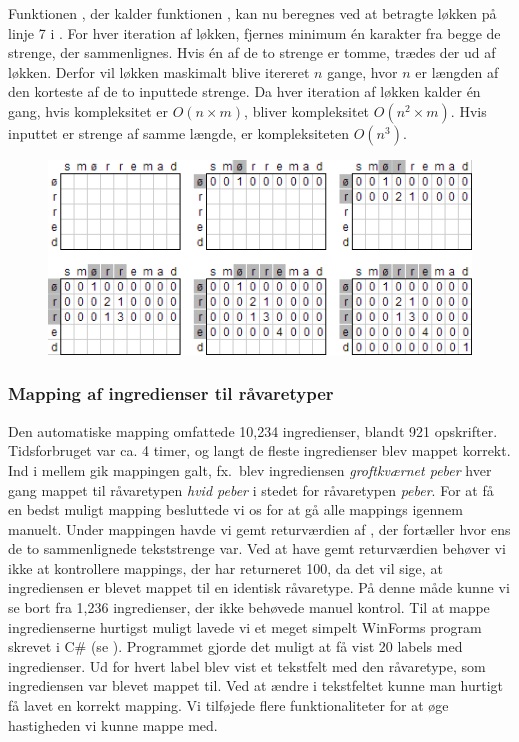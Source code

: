 Funktionen , der kalder funktionen , kan nu beregnes ved at betragte løkken på linje 7 i . For hver iteration af løkken, fjernes minimum én karakter fra begge de strenge, der sammenlignes. Hvis én af de to strenge er tomme, trædes der ud af løkken. Derfor vil løkken maskimalt blive itereret $n$ gange, hvor $n$ er længden af den korteste af de to inputtede strenge.
Da hver iteration af løkken kalder  én gang, hvis kompleksitet er $O(n \times m)$, bliver  kompleksitet $O(n^2 \times m)$. Hvis inputtet er strenge af samme længde, er kompleksiteten $O(n^3)$.
\begin{figure}
\centering
\includegraphics[scale=1]{billeder/longest-common-substring.png}
  \label{fig:longest-common-substring}
\end{figure}

\subsubsection{Mapping af ingredienser til råvaretyper}
Den automatiske mapping omfattede 10,234 ingredienser, blandt 921 opskrifter. Tidsforbruget var ca. 4 timer, og langt de fleste ingredienser blev mappet korrekt. Ind i mellem gik mappingen galt, fx.\ blev ingrediensen \textit{groftkværnet peber} hver gang mappet til råvaretypen \textit{hvid peber} i stedet for råvaretypen \textit{peber}. For at få en bedst muligt mapping besluttede vi os for at gå alle mappings igennem manuelt. Under mappingen havde vi gemt returværdien af , der fortæller hvor ens de to sammenlignede tekststrenge var. Ved at have gemt returværdien behøver vi ikke at kontrollere mappings, der har returneret 100, da det vil sige, at ingrediensen er blevet mappet til en identisk råvaretype. På denne måde kunne vi se bort fra 1,236 ingredienser, der ikke behøvede manuel kontrol.
Til at mappe ingredienserne hurtigst muligt lavede vi et meget simpelt WinForms program skrevet i C\# (se ). Programmet gjorde det muligt at få vist 20 labels med ingredienser. Ud for hvert label blev vist et tekstfelt med den råvaretype, som ingrediensen var blevet mappet til. Ved at ændre i tekstfeltet kunne man hurtigt få lavet en korrekt mapping. Vi tilføjede flere funktionaliteter for at øge hastigheden vi kunne mappe med.

